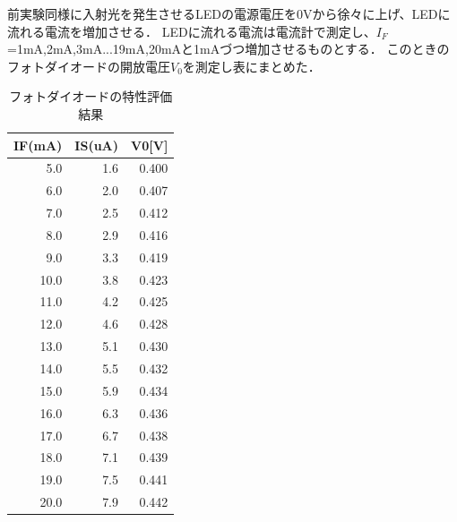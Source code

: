 \documentclass[titlepage]{jarticle}
\begin{document}
前実験同様に入射光を発生させるLEDの電源電圧を0Vから徐々に上げ、LEDに流れる電流を増加させる．
LEDに流れる電流は電流計で測定し、$I_F$=1mA,2mA,3mA...19mA,20mAと1mAづつ増加させるものとする．
このときのフォトダイオードの開放電圧$V_0$を測定し表にまとめた．

\begin{table}[htbp]
    \begin{center}
        \caption{フォトダイオードの特性評価結果}
        \begin{tabular}{r|r|r}
            \hline\hline
            \multicolumn{1}{l|}{IF(mA)} & \multicolumn{1}{l|}{IS(uA)} & \multicolumn{1}{l}{V0[V]} \\ \hline
            5.0                         & 1.6                         & 0.400                     \\ \hline
            6.0                         & 2.0                         & 0.407                     \\ \hline
            7.0                         & 2.5                         & 0.412                     \\ \hline
            8.0                         & 2.9                         & 0.416                     \\ \hline
            9.0                         & 3.3                         & 0.419                     \\ \hline
            10.0                        & 3.8                         & 0.423                     \\ \hline
            11.0                        & 4.2                         & 0.425                     \\ \hline
            12.0                        & 4.6                         & 0.428                     \\ \hline
            13.0                        & 5.1                         & 0.430                     \\ \hline
            14.0                        & 5.5                         & 0.432                     \\ \hline
            15.0                        & 5.9                         & 0.434                     \\ \hline
            16.0                        & 6.3                         & 0.436                     \\ \hline
            17.0                        & 6.7                         & 0.438                     \\ \hline
            18.0                        & 7.1                         & 0.439                     \\ \hline
            19.0                        & 7.5                         & 0.441                     \\ \hline
            20.0                        & 7.9                         & 0.442                     \\ \hline
        \end{tabular}
        \label{フォトダイオードの特性評価結果}
    \end{center}
\end{table}
\end{document}
